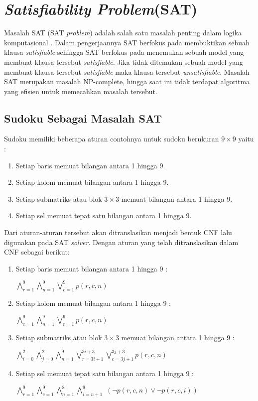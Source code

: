 \section{\textit{Satisfiability Problem}(SAT)}

Masalah SAT (SAT \textit{problem}) adalah salah satu masalah penting dalam logika komputasional \cite{huth2004logic}. Dalam pengerjaannya SAT berfokus pada membuktikan sebuah klausa \textit{satisfiable} sehingga SAT berfokus pada menemukan sebuah model yang membuat klausa tersebut \textit{satisfiable}. Jika tidak ditemukan sebuah model yang membuat klausa tersebut \textit{satisfiable} maka klausa tersebut \textit{unsatisfiable}. Masalah SAT merupakan masalah NP-complete, hingga saat ini tidak
terdapat algoritma yang efisien untuk memecahkan masalah tersebut. 

\subsection{Sudoku Sebagai Masalah SAT}
Sudoku memiliki beberapa aturan contohnya untuk sudoku berukuran  $9 \times 9$ yaitu :

\begin{enumerate}
	\item Setiap baris memuat bilangan antara 1 hingga 9.
	\item Setiap kolom memuat bilangan antara 1 hingga 9.
	\item Setiap submatriks atau blok $3 \times 3$
	 memuat bilangan antara 1 hingga 9.
	\item Setiap sel memuat tepat satu bilangan antara 1 hingga 9.
\end{enumerate}

Dari aturan-aturan tersebut akan ditranslasikan menjadi bentuk CNF lalu digunakan pada SAT \textit{solver}. Dengan aturan yang telah ditranslasikan dalam CNF sebagai berikut:

\begin{enumerate}
	\item Setiap baris memuat bilangan antara 1 
	hingga 9 : 
	
	$\bigwedge_{r=1}^{9}$$\bigwedge_{n=1}^{9}$$\bigvee_{c=1}^{9}$$p\left(r,c,n\right)$
	
	\item Setiap kolom memuat bilangan antara 1 hingga 9 : 
	
	$\bigwedge_{c=1}^{9}$$\bigwedge_{n=1}^{9}$$\bigvee_{r=1}^{9}$$p\left(r,c,n\right)$
	
	\item Setiap submatriks atau blok $3 \times 3$
	memuat bilangan antara 1 hingga 9 : 
	
	$\bigwedge_{i=0}^{2}$$\bigwedge_{j=0}^{2}$$\bigwedge_{n=1}^{9}$$\bigvee_{r=3i+1}^{3i+3}$$\bigvee_{c=3j+1}^{3j+3}$$p\left(r,c,n\right)$
	
	\item Setiap sel memuat tepat satu bilangan antara 1 hingga 9 : 
	
	$\bigwedge_{r=1}^{9}$$\bigwedge_{c=1}^{9}$$\bigwedge_{n=1}^{8}$$\bigwedge_{i=n+1}^{9}$
	$\left(\neg p\left(r,c,n\right)\vee\neg p\left(r,c,i\right)\right)$
	
\end{enumerate}

